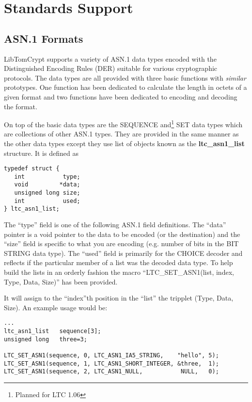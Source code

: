 \documentclass[a4paper]{book}
\begin{document}
\chapter{Standards Support}
\section{ASN.1 Formats}
LibTomCrypt supports a variety of ASN.1 data types encoded with the Distinguished Encoding Rules (DER) suitable for various cryptographic protocols.  The data types
are all provided with three basic functions with \textit{similar} prototypes.  One function has been dedicated to calculate the length in octets of a given
format and two functions have been dedicated to encoding and decoding the format.  

On top of the basic data types are the SEQUENCE and\footnote{Planned for LTC 1.06} SET data types which are collections of other ASN.1 types.  They are provided 
in the same manner as the other data types except they use list of objects known as the \textbf{ltc\_asn1\_list} structure.  It is defined as 

\begin{verbatim}
typedef struct {
   int           type;
   void         *data;
   unsigned long size;
   int           used;
} ltc_asn1_list;
\end{verbatim}

The ``type'' field is one of the following ASN.1 field definitions.  The ``data'' pointer is a void pointer to the data to be encoded (or the destination) and the 
``size'' field is specific to what you are encoding (e.g. number of bits in the BIT STRING data type).  The ``used'' field is primarily for the CHOICE decoder
and reflects if the particular member of a list was the decoded data type.  To help build the lists in an orderly fashion the macro
``LTC\_SET\_ASN1(list, index, Type, Data, Size)'' has been provided.

It will assign to the ``index''th position in the ``list'' the tripplet (Type, Data, Size).  An example usage would be:

\begin{small}
\begin{verbatim}
...
ltc_asn1_list   sequence[3];
unsigned long   three=3;

LTC_SET_ASN1(sequence, 0, LTC_ASN1_IA5_STRING,    "hello", 5);
LTC_SET_ASN1(sequence, 1, LTC_ASN1_SHORT_INTEGER, &three,  1);
LTC_SET_ASN1(sequence, 2, LTC_ASN1_NULL,           NULL,   0);
\end{verbatim}
\end{small}
\end{document}
